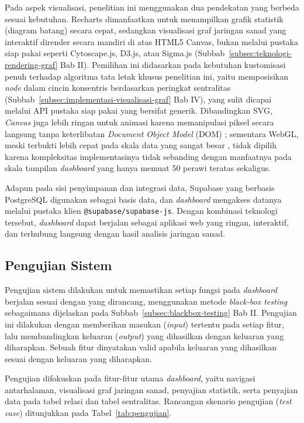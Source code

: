 Pada aspek visualisasi, penelitian ini menggunakan dua pendekatan yang berbeda sesuai kebutuhan. Recharts dimanfaatkan untuk menampilkan grafik statistik (diagram batang) secara cepat, sedangkan visualisasi graf jaringan sanad yang interaktif dirender secara mandiri di atas HTML5 Canvas, bukan melalui pustaka siap pakai seperti Cytoscape.js, D3.js, atau Sigma.js (Subbab~\ref{subsec:teknologi-rendering-graf} Bab II). Pemilihan ini didasarkan pada kebutuhan kustomisasi penuh terhadap algoritma tata letak khusus penelitian ini, yaitu memposisikan \textit{node} dalam cincin konsentris berdasarkan peringkat sentralitas (Subbab~\ref{subsec:implementasi-visualisasi-graf} Bab IV), yang sulit dicapai melalui API pustaka siap pakai yang bersifat generik. Dibandingkan SVG, \textit{Canvas} juga lebih ringan untuk animasi karena memanipulasi piksel secara langsung tanpa keterlibatan \textit{Document Object Model} (DOM) \cite{Zhao2025}; sementara WebGL, meski terbukti lebih cepat pada skala data yang sangat besar \cite{Zhao2025}, tidak dipilih karena kompleksitas implementasinya tidak sebanding dengan manfaatnya pada skala tampilan \textit{dashboard} yang hanya memuat 50 perawi teratas sekaligus.

\begin{sloppypar}
Adapun pada sisi penyimpanan dan integrasi data, Supabase yang berbasis PostgreSQL digunakan sebagai basis data, dan \textit{dashboard} mengakses datanya melalui pustaka klien \texttt{@supabase/supabase-js}. Dengan kombinasi teknologi tersebut, \textit{dashboard} dapat berjalan sebagai aplikasi web yang ringan, interaktif, dan terhubung langsung dengan hasil analisis jaringan sanad.
\end{sloppypar}

\subsection{Pengujian Sistem}
Pengujian sistem dilakukan untuk memastikan setiap fungsi pada \textit{dashboard} berjalan sesuai dengan yang dirancang, menggunakan metode \textit{black-box testing} sebagaimana dijelaskan pada Subbab~\ref{subsec:blackbox-testing} Bab II. Pengujian ini dilakukan dengan memberikan masukan (\textit{input}) tertentu pada setiap fitur, lalu membandingkan keluaran (\textit{output}) yang dihasilkan dengan keluaran yang diharapkan. Sebuah fitur dinyatakan valid apabila keluaran yang dihasilkan sesuai dengan keluaran yang diharapkan.

Pengujian difokuskan pada fitur-fitur utama \textit{dashboard}, yaitu navigasi antarhalaman, visualisasi graf jaringan sanad, penyajian statistik, serta penyajian data pada tabel relasi dan tabel sentralitas. Rancangan skenario pengujian (\textit{test case}) ditunjukkan pada Tabel~\ref{tab:pengujian}.

